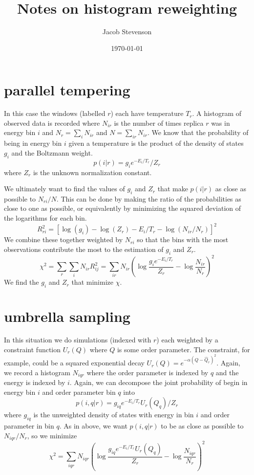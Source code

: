 \documentclass[a4paper]{article}
\title{Notes on histogram reweighting}
\author{Jacob Stevenson}
\date{\today}
\begin{document}
\maketitle


\section{parallel tempering}

In this case the windows (labelled $r$) each have temperature $T_r$.
A histogram of observed data is recorded where $N_{ir}$ is the number of times
replica $r$ was in energy bin $i$ and $N_r = \sum_i N_{ir}$ and $N = \sum_{ir}  N_{ir}$.
We know that the probability of being in energy bin $i$ given a temperature is
the product of the density of states $g_i$ and the Boltzmann weight.
\begin{equation}
p(i | r) = g_i e^{- E_i / T_r} / Z_{r}
\end{equation}
where $Z_{r}$ is the unknown normalization constant.

We ultimately want to find the values of $g_i$ and $Z_{r}$ that make $p(i|r)$ as 
close as possible to $N_{ri} / N$.  This can be done by making the ratio of the probabilities
as close to one as possible, or equivalently by minimizing the squared deviation of the logarithms for each bin.
\begin{equation}
R_{ri}^2 = \left[ \log(g_i) - \log(Z_{r}) - E_i/T_r - \log(N_{ir} / N_r) \right]^2
\end{equation}
We combine these together weighted by $N_{ri}$ so that the bins with the most observations contribute the most to the 
estimation of $g_i$ and $Z_r$.
\begin{equation}
\chi^2 = \sum_r \sum_i N_{ir} R_{ij}^2 = \sum_{ir} N_{ir} \left( \log \frac{g_{i} e^{- E_i/T_r}}{Z_r} - \log \frac{N_{ir}}{N_r} \right)^2
\end{equation}
We find the $g_i$ and $Z_r$ that minimize $\chi$.

\section{umbrella sampling}

In this situation we do simulations (indexed with $r$) each weighted by a constraint function $U_r(Q)$ where
$Q$ is some order parameter.  The constraint, for example, could be a squared exponential decay 
$U_r(Q) = e^{ -\alpha (Q - \hat{Q}_r )^2}$.  
Again, we record a histogram $N_{iqr}$ where the order parameter is indexed by $q$ and
the energy is indexed by $i$.
Again, we can decompose the joint probability of begin in energy bin $i$ and order parameter bin $q$ into
\begin{equation}
p(i,q|r) = g_{iq} e^{-E_i / T_r} U_r(Q_q) / Z_{r}
\end{equation}
where $g_{iq}$ is the unweighted density of states with energy in bin $i$ and order parameter in bin $q$.
As in above, we want $p(i,q|r)$ to be as close as possible to $N_{iqr}/N_r$, so we minimize
\begin{equation}
\chi^2 = \sum_{iqr} N_{iqr} \left( \log \frac{g_{iq} e^{- E_i/T_r} U_r(Q_q) }{Z_r} - \log \frac{N_{iqr}}{N_r} \right)^2
\end{equation}
\end{document}
